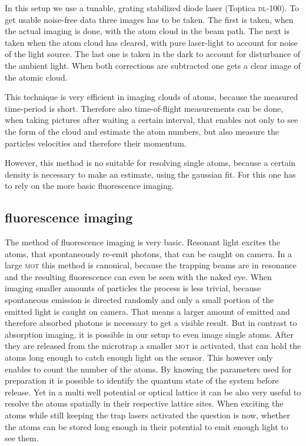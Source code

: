 In this setup we use a tunable, grating stabilized diode laser (Toptica \textsc{dl}-100). To get usable noise-free data three images has to be taken. The first is taken, when the actual imaging is done, with the atom cloud in the beam path. The next is taken when the atom cloud has cleared, with pure laser-light to account for noise of the light source. The last one is taken in the dark to account for disturbance of the ambient light. When both corrections are subtracted one gets a clear image of the atomic cloud.

This technique is very efficient in imaging clouds of atoms, because the measured time-period is short. Therefore also time-of-flight measurements can be done, when taking pictures after waiting a certain interval, that enables not only to see the form of the cloud and estimate the atom numbers, but also measure the particles velocities and therefore their momentum.

However, this method is no suitable for resolving single atoms, because a certain density is necessary to make an estimate, using the gaussian fit. For this one has to rely on the more basic fluorescence imaging.

\subsection{fluorescence imaging}

The method of fluorescence imaging is very basic\cite{timo}. Resonant light excites the atoms, that spontaneously re-emit photons, that can be caught on camera. In a large \textsc{mot} this method is canonical, because the trapping beams are in resonance and the resulting fluorescence can even be seen with the naked eye. When imaging smaller amounts of particles the process is less trivial, because spontaneous emission is directed randomly and only a small portion of the emitted light is caught on camera. That means a larger amount of emitted and therefore absorbed photons is necessary to get a visible result. But in contrast to absorption imaging, it is possible in our setup to even image single atoms. After they are released from the microtrap a smaller \textsc{mot} is activated, that can hold the atoms long enough to catch enough light on the sensor. This however only enables to count the number of the atoms. By knowing the parameters used for preparation it is possible to identify the quantum state of the system before release. Yet in a multi well potential or optical lattice it can be also very useful to resolve the atoms spatially in their respective lattice sites. When exciting the atoms while still keeping the trap lasers activated the question is now, whether the atoms can be stored long enough in their potential to emit enough light to see them.

